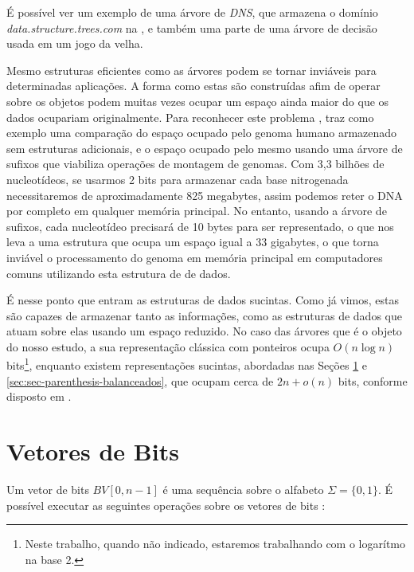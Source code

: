 É possível ver um exemplo de uma árvore de \textit{DNS},  que armazena o domínio \textit{data.structure.trees.com} na , e também uma parte de uma árvore de decisão usada em um jogo da velha.

Mesmo estruturas eficientes como as árvores podem se tornar inviáveis para determinadas aplicações. A forma como estas são construídas afim de operar sobre os objetos podem muitas vezes ocupar um espaço ainda maior do que os dados ocupariam originalmente. Para reconhecer este problema \citet{book-compact-data-structures}, traz como exemplo uma comparação do espaço ocupado pelo genoma humano armazenado sem estruturas adicionais, e o espaço ocupado pelo mesmo usando uma árvore de sufixos que viabiliza operações de montagem de genomas. Com  3,3 bilhões de nucleotídeos, se usarmos 2 bits para armazenar cada base nitrogenada necessitaremos de aproximadamente 825 megabytes, assim podemos reter o DNA por completo em qualquer memória principal. No entanto, usando a árvore de sufixos, cada nucleotídeo precisará de 10 bytes para ser representado, o que nos leva a uma estrutura que ocupa um espaço igual a 33 gigabytes, o que torna inviável o processamento do genoma em memória principal em computadores comuns utilizando esta estrutura de de dados. %

É nesse ponto que entram as estruturas de dados sucintas. Como já vimos, estas são capazes de armazenar tanto as informações, como as estruturas de dados que atuam sobre elas usando um espaço reduzido. No caso das árvores que é o objeto do nosso estudo, a sua representação clássica com ponteiros  ocupa  $O(n \log n)$ bits\footnote{Neste trabalho, quando não indicado, estaremos trabalhando com o logarítmo na base 2.}, enquanto existem representações sucintas, abordadas nas Seções \ref{sec:sec-bitvector} e \ref{sec:sec-parenthesis-balanceados}, que ocupam cerca de $2n+o(n)$ bits, conforme disposto em \cite{book-compact-data-structures}.

\section{Vetores de Bits}\label{sec:sec-bitvector}
Um vetor de bits $BV[0,n-1]$  é uma sequência sobre o alfabeto $\Sigma = \{0,1\}$. É possível executar as seguintes operações sobre os vetores de bits \citep{book-compact-data-structures}:


